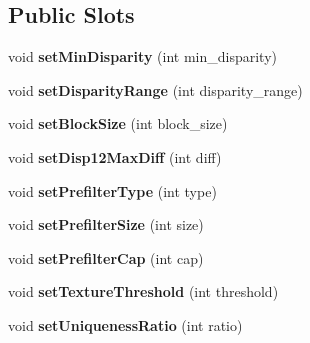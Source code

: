 \subsection*{Public Slots}
\begin{DoxyCompactItemize}
\item 
\hypertarget{class_matcher_open_c_v_block_a0eb06c5ced42857eda54abc71cc86746}{}void {\bfseries set\+Min\+Disparity} (int min\+\_\+disparity)\label{class_matcher_open_c_v_block_a0eb06c5ced42857eda54abc71cc86746}

\item 
\hypertarget{class_matcher_open_c_v_block_a8c4b003fdcdd3be586dee4c5ae0cd81f}{}void {\bfseries set\+Disparity\+Range} (int disparity\+\_\+range)\label{class_matcher_open_c_v_block_a8c4b003fdcdd3be586dee4c5ae0cd81f}

\item 
\hypertarget{class_matcher_open_c_v_block_a4a34614f23f03c4505f6dcde975ca3cc}{}void {\bfseries set\+Block\+Size} (int block\+\_\+size)\label{class_matcher_open_c_v_block_a4a34614f23f03c4505f6dcde975ca3cc}

\item 
\hypertarget{class_matcher_open_c_v_block_a929bdcd0ddc2d0e64a83d9b467226a45}{}void {\bfseries set\+Disp12\+Max\+Diff} (int diff)\label{class_matcher_open_c_v_block_a929bdcd0ddc2d0e64a83d9b467226a45}

\item 
\hypertarget{class_matcher_open_c_v_block_a210b7cf4f75d7507643af3a826695aa6}{}void {\bfseries set\+Prefilter\+Type} (int type)\label{class_matcher_open_c_v_block_a210b7cf4f75d7507643af3a826695aa6}

\item 
\hypertarget{class_matcher_open_c_v_block_acee691720a3fe7c796dbbf74f7a06da4}{}void {\bfseries set\+Prefilter\+Size} (int size)\label{class_matcher_open_c_v_block_acee691720a3fe7c796dbbf74f7a06da4}

\item 
\hypertarget{class_matcher_open_c_v_block_a4ee85d786a4feb635151cfd4bb656564}{}void {\bfseries set\+Prefilter\+Cap} (int cap)\label{class_matcher_open_c_v_block_a4ee85d786a4feb635151cfd4bb656564}

\item 
\hypertarget{class_matcher_open_c_v_block_a668eaeb56744a3982d90a1e7b1c5ead7}{}void {\bfseries set\+Texture\+Threshold} (int threshold)\label{class_matcher_open_c_v_block_a668eaeb56744a3982d90a1e7b1c5ead7}

\item 
\hypertarget{class_matcher_open_c_v_block_ae6d8ad706c2743abc1998a7e7deae899}{}void {\bfseries set\+Uniqueness\+Ratio} (int ratio)\label{class_matcher_open_c_v_block_ae6d8ad706c2743abc1998a7e7deae899}


\end{DoxyCompactItemize}
